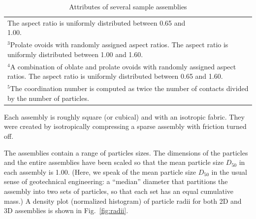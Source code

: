 \documentclass[letterpaper,11pt]{article}
\begin{document}
\begin{table}
\begin{tabular}{lccccc}
{{The aspect ratio is uniformly distributed between 0.65 and 1.00.%
}}\\
\multicolumn{6}{l}{\parbox{4.80in}{%
$^{3} $Prolate ovoids with randomly assigned aspect ratios.
The aspect ratio is uniformly distributed between 1.00 and 1.60.%
}}\\
\multicolumn{6}{l}{\parbox{4.80in}{%
$^{4} $A combination of oblate and prolate ovoids with 
randomly assigned aspect ratios.
The aspect ratio is uniformly distributed between 0.65 and 1.60.%
}}\\
\multicolumn{6}{l}{\parbox{4.80in}{%
$^{5} $The coordination number is computed as twice the number of contacts
divided by the number of particles.
}}\\
\hline
\hline
\end{tabular}
\caption{Attributes of several sample assemblies}
\label{table:assemblies}
\end{table}
Each assembly is roughly square (or cubical)
and with an isotropic fabric.
They were created by isotropically compressing a sparse assembly with
friction turned off.
\par
The assemblies contain a range of particles sizes.
The dimensions of the particles and the entire assemblies have
been scaled so that the mean particle size 
$D_{50}$ in each assembly is 1.00.
(\label{page:d50}Here, 
we speak of the mean particle size $D_{50}$ in the usual sense
of geotechnical engineering:  a ``median'' diameter that partitions
the assembly into two sets of particles, so that each set has an equal
cumulative mass.)
A density plot (normalized histogram) of 
particle radii for both 2D and 3D assemblies is shown
in Fig.~\ref{fig:radii}.  
\end{document}
